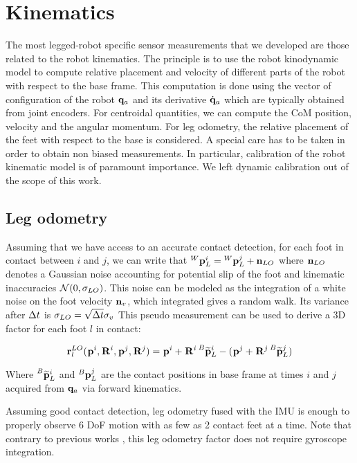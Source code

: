 \chapter{Kinematics}
\minitoc

The most legged-robot specific sensor measurements that we developed are those related to the robot kinematics. 
The principle is to use the robot kinodynamic model to compute relative placement and velocity of different parts of the robot 
with respect to the base frame. This computation is done using the vector of configuration of the robot ${\bf q}_a$ and its derivative $\dot{{\bf q}}_a$ which
are typically obtained from joint encoders.
For centroidal quantities, we can compute the CoM position, velocity and the angular momentum.
For leg odometry, the relative placement of the feet with respect to the base is considered. A special care has to be taken in order to
obtain non biased measurements. In particular, calibration of the robot kinematic model is of paramount importance. We left dynamic calibration 
out of the scope of this work.

\section{Leg odometry}
Assuming that we have access to an accurate contact detection, for each foot in contact between \keyframes $i$ and $j$, we can write that 
$\prescript{W}{}{{\bf p}}_{L}^i = \prescript{W}{}{{\bf p}}_{L}^j + {\bf n}_{LO}$ where ${\bf n}_{LO}$ denotes a Gaussian noise accounting for potential slip of the foot and kinematic inaccuracies 
$\mathcal{N}({0},{\sigma_{LO}})$.
This noise can be modeled as the integration of a white noise on the foot velocity ${\bf n}_v$, which integrated gives a random walk.  
Its variance after $\Delta t$ is $\sigma_{LO} = \sqrt{\Delta t} \sigma_v$
This pseudo measurement can be used to derive a 3D factor for each foot $l$ in contact:

\begin{equation}
    {\bf r}^{LO}_l(\prescript{}{}{{\bf p}}_{}^i, \prescript{}{}{{\bf R}}_{}^i, \prescript{}{}{{\bf p}}_{}^j, \prescript{}{}{{\bf R}}_{}^j) = \prescript{}{}{{\bf p}}_{}^i + \prescript{}{}{{\bf R}}_{}^i \prescript{B}{}{\widetilde{{\bf p}}}_{L}^i - (\prescript{}{}{{\bf p}}_{}^j + \prescript{}{}{{\bf R}}_{}^j \prescript{B}{}{\widetilde{{\bf p}}}_{L}^j)
\end{equation}

Where $\prescript{B}{}{\widetilde{{\bf p}}}_{L}^i$ and $\prescript{B}{}{{\bf p}}_{L}^j$ are the contact positions in base frame at times $i$ and $j$ acquired from ${\bf q}_a$ via forward kinematics. 

Assuming good contact detection, leg odometry fused with the IMU is enough to properly observe 6 DoF motion with as few as 2 contact feet at a time. 
Note that contrary to previous works \cite{hartley2018legged, wisth2020preintegrated}, this leg odometry factor does not require gyroscope integration.


